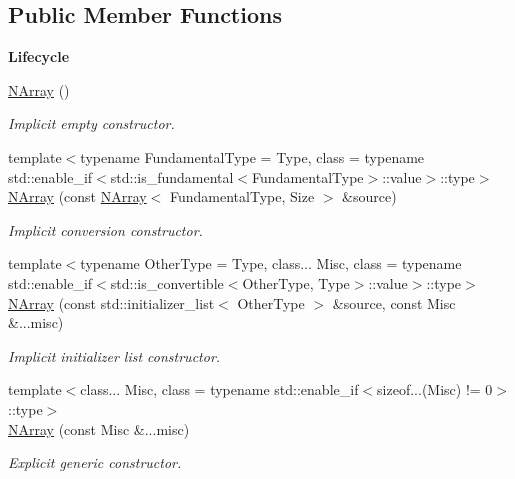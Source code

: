 \subsection*{Public Member Functions}
\begin{Indent}{\bf Lifecycle}\par
\begin{DoxyCompactItemize}
\item 
\hyperlink{exceptionmagrathea_1_1NArray_acca52d7eebaed0e348d08bbe0842a472}{N\-Array} ()
\begin{DoxyCompactList}\small\item\em Implicit empty constructor. \end{DoxyCompactList}\item 
{\footnotesize template$<$typename Fundamental\-Type  = Type, class  = typename std\-::enable\-\_\-if$<$std\-::is\-\_\-fundamental$<$\-Fundamental\-Type$>$\-::value$>$\-::type$>$ }\\\hyperlink{exceptionmagrathea_1_1NArray_a3eeaff0a8e63e6d61637b00ad90a3421}{N\-Array} (const \hyperlink{exceptionmagrathea_1_1NArray}{N\-Array}$<$ Fundamental\-Type, Size $>$ \&source)
\begin{DoxyCompactList}\small\item\em Implicit conversion constructor. \end{DoxyCompactList}\item 
{\footnotesize template$<$typename Other\-Type  = Type, class... Misc, class  = typename std\-::enable\-\_\-if$<$std\-::is\-\_\-convertible$<$\-Other\-Type, Type$>$\-::value$>$\-::type$>$ }\\\hyperlink{exceptionmagrathea_1_1NArray_a72b7915a39e9b3c8e99402b1d5fad08c}{N\-Array} (const std\-::initializer\-\_\-list$<$ Other\-Type $>$ \&source, const Misc \&...misc)
\begin{DoxyCompactList}\small\item\em Implicit initializer list constructor. \end{DoxyCompactList}\item 
{\footnotesize template$<$class... Misc, class  = typename std\-::enable\-\_\-if$<$sizeof...(\-Misc) != 0$>$\-::type$>$ }\\\hyperlink{exceptionmagrathea_1_1NArray_a9e5be0242ff3e1261e40bdd4bdaf7b58}{N\-Array} (const Misc \&...misc)
\begin{DoxyCompactList}\small\item\em Explicit generic constructor. \end{DoxyCompactList}\end{DoxyCompactItemize}
\end{Indent}
